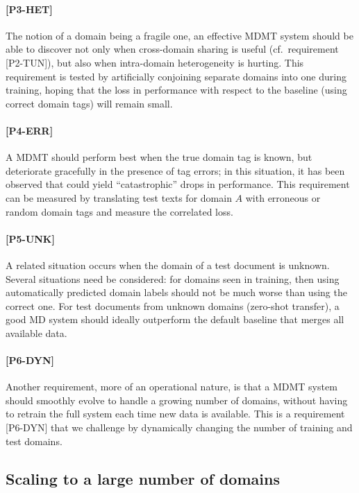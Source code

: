 \documentclass[11pt,a4paper]{article}
\newcommand{\fyTodo}[1]{\Todo[FY:]{\textcolor{orange}{#1}}}
\newcommand{\fyDone}[1]{\done[FY]\Todo[FY:]{\textcolor{orange}{#1}}}
\newcommand{\jcTodo}[1]{\Todo[JC:]{\textcolor{red}{#1}}}
\newcommand{\jcDone}[1]{\done[JC]\Todo[JC:]{\textcolor{red}{#1}}}
\begin{document}
\paragraph{[P3-HET]}
The notion of a domain being a fragile one, an effective MDMT system should be able to discover not only when cross-domain sharing is useful (cf.\ requirement [P2-TUN])\jcDone{what is P2.2?}, but also when intra-domain heterogeneity is hurting. This requirement is tested by artificially conjoining separate domains into one during training, hoping that the loss in performance with respect to the baseline (using correct domain tags) will remain small.

\paragraph{[P4-ERR]}
A MDMT should perform best when the true domain tag is known, but deteriorate gracefully in the presence of tag errors; in this situation, it has been observed that could yield ``catastrophic'' drops in performance\jcTodo{cite needed?}. This requirement can be measured by translating test texts for domain $A$ with erroneous or random domain tags and measure the correlated loss.

\paragraph{[P5-UNK]}
A related situation occurs when the domain of a test document is unknown. Several situations need be considered: for domains seen in training, then using automatically predicted domain labels should not be much worse than using the correct one. For test documents from unknown domains (zero-shot transfer), a good MD system should ideally outperform the default baseline that merges all available data.\fyDone{Systems react to unknown domains}

\paragraph{[P6-DYN]}
Another requirement, more of an operational nature, is that a MDMT system should smoothly evolve to handle a growing number of domains, without having to retrain the full system each time new data is available. This is a requirement [P6-DYN] that we challenge by dynamically changing the number of training and test domains.

\subsection{Scaling to a large number of domains \label{ssec:scaling}}
\end{document}
